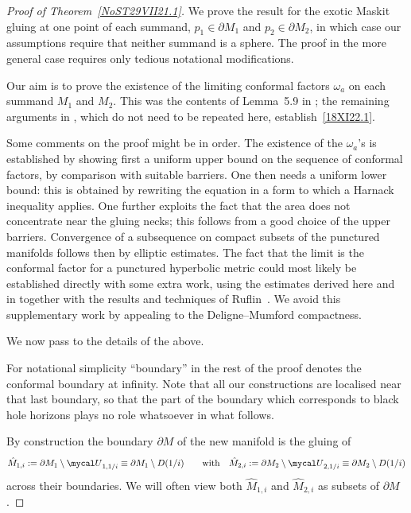 \documentclass[pdftex]{sigma}
\numberwithin{equation}{section}
\newcommand{\zMone}{\red{{\hat M}_{1,i}}}
\newcommand{\zMtwo}{\red{{\hat M}_{2,i}}}
\newcommand{\red}[1]{{\color{red}#1}}
\newcommand{\mcU}{{\mycal U}}
\renewcommand{\red}[1]{#1}
\begin{document}
\begin{proof}[Proof of Theorem~\ref{NoST29VII21.1}]
We prove the result for the exotic Maskit gluing at one point
of each summand, {$p_1\in \partial M_1$ and $p_2 \in \partial M_2$},
in which case our assumptions require that neither summand is a sphere.
The proof in the {more} general case requires only {tedious} notational modifications.

Our aim is to prove
the existence of the limiting conformal factors $\omega_a$ on each summand $M_1$ and $M_2$. This was the contents of Lemma~5.9 in \cite{CDW}; the remaining arguments in \cite{CDW}, which do not need to be repeated here, establish~\eqref{18XI22.1}.

Some comments on the proof might be in order. The existence of the $\omega_a$'s is established by showing first a uniform upper bound on the sequence of conformal factors, by comparison with suitable barriers. One then needs a uniform lower bound: this is obtained by rewriting the equation in a form
to which a Harnack inequality applies. One further exploits the fact that the area does not
concentrate near the gluing necks; this follows from a good choice of the upper barriers. Convergence of a subsequence on compact subsets of the punctured manifolds follows then by elliptic estimates. The fact that the limit is the conformal factor for a punctured hyperbolic metric could most likely be established directly with some extra work, using the estimates derived here and in \cite{CDW} together with the results and techniques of Ruflin~\cite{Rupflin}. We avoid this supplementary work by appealing to the Deligne--Mumford compactness.

We now pass to the details of the above.

For notational simplicity ``boundary'' in the rest of the proof denotes the conformal boundary at infinity. Note that all our constructions are localised near that last boundary, so that the part of the boundary which corresponds to black hole horizons plays no role whatsoever in what follows.

By construction the boundary $\partial M$ of the new manifold is the gluing of
\[
 \zMone := \partial M_1\setminus \mcU_{1, \red{1/i}} \equiv \partial M_1\setminus \red{D(}1/i)
 \qquad
 \mbox{with}
 \quad
 \zMtwo := \partial M_2\setminus \mcU_{2, \red{1/i}}
 \equiv \partial M_2\setminus \red{D(}1/i)
\]
across their boundaries.
We will often view both
 $\zMone $ and $\zMtwo $ as subsets of $\partial M$.


\end{proof}
\end{document}
